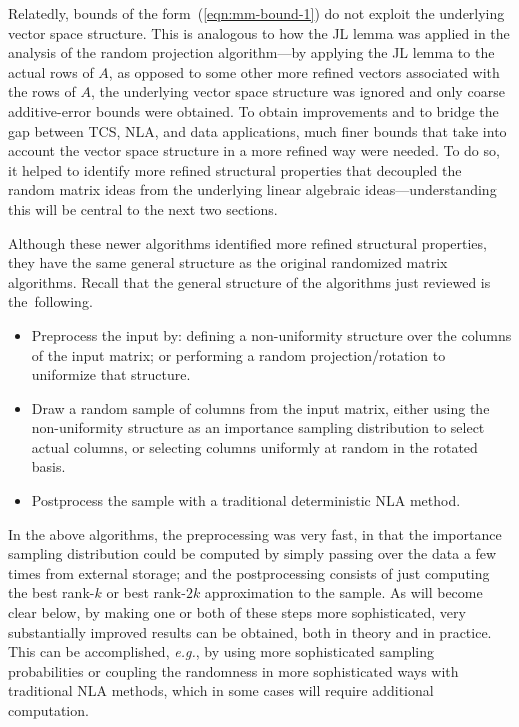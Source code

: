 \documentclass[twoside]{article}
\begin{document}
Relatedly, bounds of the form~(\ref{eqn:mm-bound-1}) do not exploit the 
underlying vector space structure.
This is analogous to how the JL lemma was applied in the analysis of the 
random projection algorithm---by applying the JL lemma to the actual rows 
of $A$, as opposed to some other more refined vectors associated with the 
rows of $A$, the underlying vector space structure was ignored and only 
coarse additive-error bounds were obtained.
To obtain improvements and to bridge the gap between TCS, NLA, and data
applications, much finer bounds that take into account the vector space 
structure in a more refined way were needed.
To do so, it helped to identify more refined structural properties that 
decoupled the random matrix ideas from the underlying linear algebraic 
ideas---understanding this will be central to the next two sections.

Although these newer algorithms identified more refined structural 
properties, they have the same general structure as the original 
randomized matrix algorithms.
Recall that the general structure of the algorithms just reviewed is 
the~following.
\begin{itemize}
\item
Preprocess the input by: defining a non-uniformity structure over the 
columns of the input matrix; or performing a random projection/rotation to 
uniformize that structure.
\item
Draw a random sample of columns from the input matrix, either using the
non-uniformity structure as an importance sampling distribution to select 
actual columns, or selecting columns uniformly at random in the rotated 
basis.
\item
Postprocess the sample with a traditional deterministic NLA method.
\end{itemize}
In the above algorithms, the preprocessing was very fast, in that the 
importance sampling distribution could be computed by simply passing over 
the data a few times from external storage; and the postprocessing consists 
of just computing the best rank-$k$ or best rank-$2k$ approximation to the 
sample.
As will become clear below, by making one or both of these steps more 
sophisticated, very substantially improved results can be obtained, both in 
theory and in practice.
This can be accomplished, \emph{e.g.}, by using more sophisticated sampling 
probabilities or coupling the randomness in more sophisticated ways with 
traditional NLA methods, which in some cases will require additional 
computation.
\end{document}
